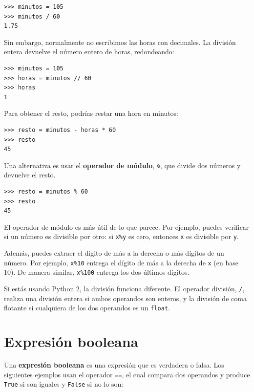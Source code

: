 \documentclass[10pt]{book}
\begin{document}
\begin{verbatim}
>>> minutos = 105
>>> minutos / 60
1.75
\end{verbatim}

Sin embargo, normalmente no escribimos las horas con decimales.  La división
entera devuelve el número entero de horas, redondeando:

\begin{verbatim}
>>> minutos = 105
>>> horas = minutos // 60
>>> horas
1
\end{verbatim}

Para obtener el resto, podrías restar una hora en minutos:

\begin{verbatim}
>>> resto = minutos - horas * 60
>>> resto
45
\end{verbatim}


Una alternativa es usar el {\bf operador de módulo}, \verb"%", que
divide dos números y devuelve el resto.

\begin{verbatim}
>>> resto = minutos % 60
>>> resto
45
\end{verbatim}
%
El operador de módulo es más útil de lo que parece.  Por
ejemplo, puedes verificar si un número es divisible por otro: si
{\tt x\%y} es cero, entonces {\tt x} es divisible por {\tt y}.

Además, puedes extraer el dígito de más a la derecha
o más dígitos de un número.  Por ejemplo, {\tt x\%10} entrega el
dígito de más a la derecha de {\tt x} (en base 10).  De manera similar, {\tt x\%100}
entrega los dos últimos dígitos.

Si estás usando Python 2, la división funciona diferente.  El
operador división, \verb"/", realiza una división entera si ambos
operandos son enteros, y la división de coma flotante si cualquiera de
los dos operandos es un {\tt float}.


\section{Expresión booleana}

Una {\bf expresión booleana} es una expresión que es verdadera
o falsa.  Los siguientes ejemplos usan el
operador {\tt ==}, el cual compara dos operandos y produce
{\tt True} si son iguales y {\tt False} si no lo son:
\end{document}
